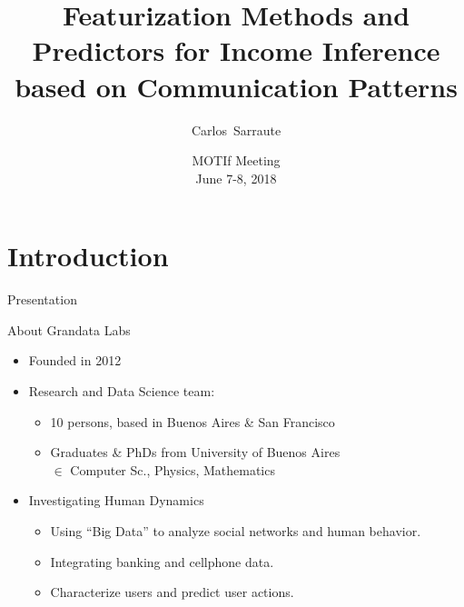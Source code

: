 \documentclass[usenames,dvipsnames]{beamer}
\title[Predictors for Income Inference]
{Featurization Methods and Predictors for Income Inference based on Communication Patterns}
\author{%
	{Carlos~Sarraute}\inst{}
}
\institute{%
	\inst{}Grandata Labs, Buenos Aires \& San Francisco \\
	\texttt{charles@grandata.com}
}
\date[MOTIf]{MOTIf Meeting \\ June 7-8, 2018}
\begin{document}
\begin{frame}
\titlepage
\end{frame}



\section{Introduction}

\begin{frame}{Presentation}

\begin{block}{About Grandata Labs}
\begin{itemize}

\item Founded in 2012

\item Research and Data Science team:
\begin{itemize}
\item 10 persons, based in Buenos Aires \& San Francisco
\item Graduates \& PhDs from University of Buenos Aires \\ $\in$ Computer Sc., Physics, Mathematics
\end{itemize}

\item Investigating Human Dynamics
\begin{itemize}
\item Using ``Big Data'' to analyze social networks and human behavior.
\item Integrating banking and cellphone data.
\item Characterize users and predict user actions.
\end{itemize}

\end{itemize}

\end{block}
\end{frame}
\end{document}
